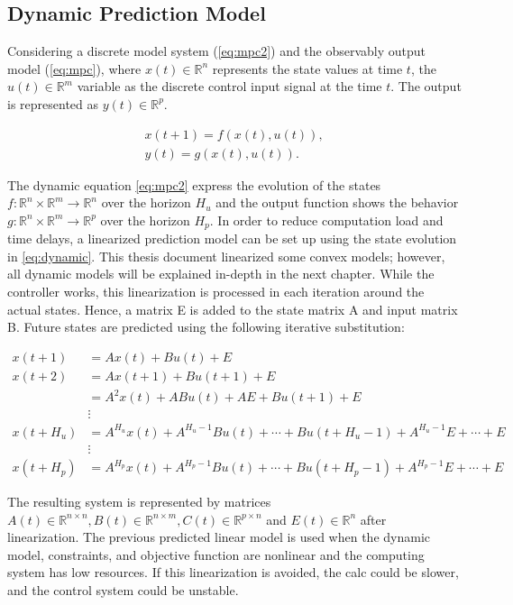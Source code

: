 \subsection{Dynamic Prediction Model}

Considering a discrete model system (\ref{eq:mpc2}) and the observably output model (\ref{eq:mpc}), where $x(t) \in \mathbb{R}^n$ represents the state values at time $t$, the $u(t) \in \mathbb{R}^m$ variable as the discrete control input signal at the time $t$. The output is represented as  $y(t) \in \mathbb{R}^p$.

\begin{align}
    x(t+1) = f(x(t),u(t)),\label{eq:mpc2}\\
    y(t) = g(x(t),u(t)). \label{eq:mpc}
\end{align}

The dynamic equation \ref{eq:mpc2} express the evolution  of the states $f:\mathbb{R}^n \times \mathbb{R}^m \to  \mathbb{R}^n$ over the horizon $H_u$ and the output function shows the behavior $g:\mathbb{R}^n \times \mathbb{R}^m \to  \mathbb{R}^p$ over the horizon $H_p$. 
In order to reduce computation load and time delays, a linearized prediction model can be set up using the state evolution in \ref{eq:dynamic}. This thesis document linearized some convex models; however, all dynamic models will be explained in-depth in the next chapter. While the controller works, this linearization is processed in each iteration around the actual states. Hence, a matrix E is added to the state matrix A and input matrix B. Future states are predicted using the following iterative substitution:

\begin{align}
x(t+1) & = Ax(t) + Bu(t)+E \\
x(t+2) & = Ax(t+1) + Bu(t+1)+E\\
       & = A^2x(t) + ABu(t)+AE +Bu(t+1) +E\\
       & \vdots  \\
x(t+H_u) & = A^{H_u}x(t) + A^{H_u-1}Bu(t)+\cdots + Bu(t+H_u-1)+ A^{H_u-1}E+\cdots +E\\
      & \vdots  \\
x(t+H_p) & = A^{H_p}x(t) + A^{H_p-1}Bu(t)+\cdots + Bu(t+H_p-1)+ A^{H_p-1}E+\cdots +E
\label{eq:dynamic}
\end{align}

The resulting system is represented by matrices $A(t) \in \mathbb{R}^{n \times n}, B(t) \in \mathbb{R}^{n \times m}, C(t) \in \mathbb{R}^{p \times n} $ and $E(t) \in \mathbb{R}^{n}$ after linearization. The previous predicted linear model is used when the dynamic model, constraints, and objective function are nonlinear and the computing system has low resources. If this linearization is avoided, the calc could be slower, and the control system could be unstable.


